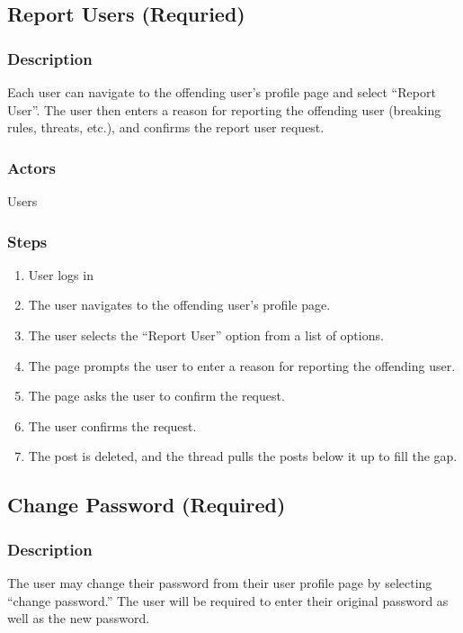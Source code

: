 \documentclass[12pt]{scrartcl}
\begin{document}
\subsection{Report Users (Requried)}
\subsubsection{Description}

Each user can navigate to the offending user’s profile page and select “Report User”. The user then enters a reason for reporting the offending user (breaking rules, threats, etc.), and confirms the report user request.

\subsubsection{Actors}

Users

\subsubsection{Steps}

\begin{enumerate}
\item User logs in
\item The user navigates to the offending user’s profile page.
\item The user selects the “Report User” option from a list of options.
\item The page prompts the user to enter a reason for reporting the offending user.
\item The page asks the user to confirm the request.
\item The user confirms the request.
\item The post is deleted, and the thread pulls the posts below it up to fill the gap.
\end{enumerate}


\subsection{Change Password (Required)}
\subsubsection{Description}

The user may change their password from their user profile page by selecting “change password.” The user will be required to enter their original password as well as the new password.
\end{document}
